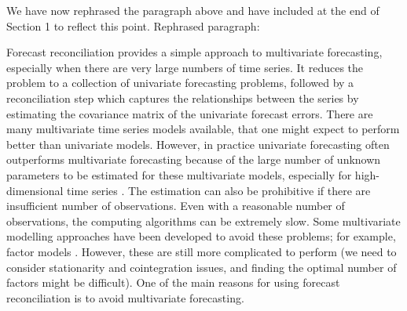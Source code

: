\documentclass[10pt,a4paper]{article}
\begin{document}
\begin{enumerate}
	{\color{blue} We have now rephrased the paragraph above and have included at the end of Section 1 to reflect this point. Rephrased paragraph:
		
	Forecast reconciliation provides a simple approach to multivariate forecasting, especially when there are very large numbers of time series. It reduces the problem to a collection of univariate forecasting problems, followed by a reconciliation step  which captures the relationships between the series by estimating the covariance matrix of the univariate forecast errors. There are many multivariate time series models available, that one might expect to perform better than univariate models. However, in practice univariate forecasting often outperforms multivariate forecasting because of the large number of unknown parameters to be estimated for these multivariate models, especially for high-dimensional time series \citep{Chatfield2000}. The estimation can also be prohibitive if there are insufficient number of observations. Even with a reasonable number of observations, the computing algorithms can be extremely slow. Some multivariate modelling approaches have been developed to avoid these problems; for example, factor models \citep[see][Econometrica]{Bai2003}. However, these are still more complicated to perform (we need to consider stationarity and cointegration issues, and finding the optimal number of factors might be difficult). One of the main reasons for using forecast reconciliation is to avoid multivariate forecasting.}
\end{enumerate}

\printbibliography
\end{document}
